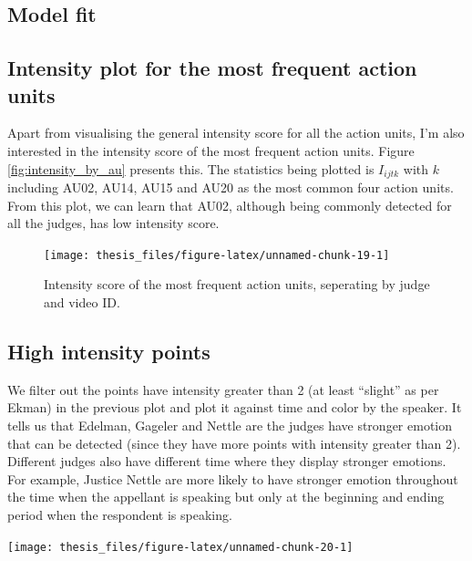 \documentclass{monashthesis}
\begin{document}
\hypertarget{model-fit-2}{%
\subsection{Model fit}\label{model-fit-2}}

\hypertarget{intensity-plot-for-the-most-frequent-action-units}{%
\subsection{Intensity plot for the most frequent action units}\label{intensity-plot-for-the-most-frequent-action-units}}

Apart from visualising the general intensity score for all the action units, I'm also interested in the intensity score of the most frequent action units. Figure \ref{fig:intensity_by_au} presents this. The statistics being plotted is \(I_{ijtk}\) with \(k\) including AU02, AU14, AU15 and AU20 as the most common four action units. From this plot, we can learn that AU02, although being commonly detected for all the judges, has low intensity score.

\begin{figure}
\texttt{[image: thesis\_files/figure-latex/unnamed-chunk-19-1]} \caption{Intensity score of the most frequent action units, seperating by judge and video ID.\label{fig:intensity_by_au}}\label{fig:unnamed-chunk-19}
\end{figure}

\hypertarget{high-intensity-points}{%
\subsection{High intensity points}\label{high-intensity-points}}

We filter out the points have intensity greater than 2 (at least ``slight'' as per Ekman) in the previous plot and plot it against time and color by the speaker. It tells us that Edelman, Gageler and Nettle are the judges have stronger emotion that can be detected (since they have more points with intensity greater than 2). Different judges also have different time where they display stronger emotions. For example, Justice Nettle are more likely to have stronger emotion throughout the time when the appellant is speaking but only at the beginning and ending period when the respondent is speaking.

\texttt{[image: thesis\_files/figure-latex/unnamed-chunk-20-1]}

\appendix
\end{document}
